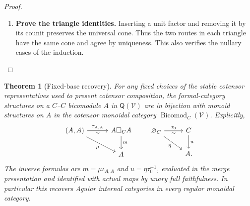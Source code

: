 \documentclass[11pt,reqno]{amsart}
\theoremstyle{plain}
\newtheorem{theorem}{Theorem}[section]
\theoremstyle{definition}
\theoremstyle{remark}
\numberwithin{equation}{section}
\newcommand{\V}{\mathcal V}
\newcommand{\Q}{\mathsf Q}
\newcommand{\emp}[1]{\varnothing_{#1}}
\newcommand{\Bicomod}{\operatorname{Bicomod}}
\begin{document}
\begin{proof}
\begin{enumerate}
\item \textbf{Prove the triangle identities.} Inserting a unit
factor and removing it by its counit preserves the universal cone.
Thus the two routes in each triangle have the same cone and agree
by uniqueness. This also verifies the nullary cases of the induction.\qedhere
\end{enumerate}
\end{proof}

\begin{theorem}[Fixed-base recovery]\label{thm:aguiar}
For any fixed choices of the stable cotensor representatives used to
present cotensor composition, the formal-category structures on a
$C$--$C$ bicomodule $A$ in $\Q(\V)$ are in bijection with monoid
structures on $A$ in the cotensor monoidal category
$\Bicomod_C(\V)$. Explicitly,
\begin{equation}\label{eq:mutransport}
\begin{tikzcd}[column sep=3em]
(A,A) \arrow[r,"\tau_{A,A}","\sim"'] \arrow[dr,"\mu"'] &
A\square_C A \arrow[d,"m"]\\
& A
\end{tikzcd}
\qquad
\begin{tikzcd}[column sep=2.6em]
\emp C \arrow[r,"\tau_0","\sim"'] \arrow[dr,"\eta"'] &
C \arrow[d,"u"]\\
& A.
\end{tikzcd}
\end{equation}
The inverse formulas are $m=\mu\iota_{A,A}$ and
$u=\eta\tau_0^{-1}$, evaluated in the merge presentation and identified
with actual maps by unary full faithfulness.
In particular this recovers Aguiar internal categories in every regular
monoidal category.
\end{theorem}
\end{document}
